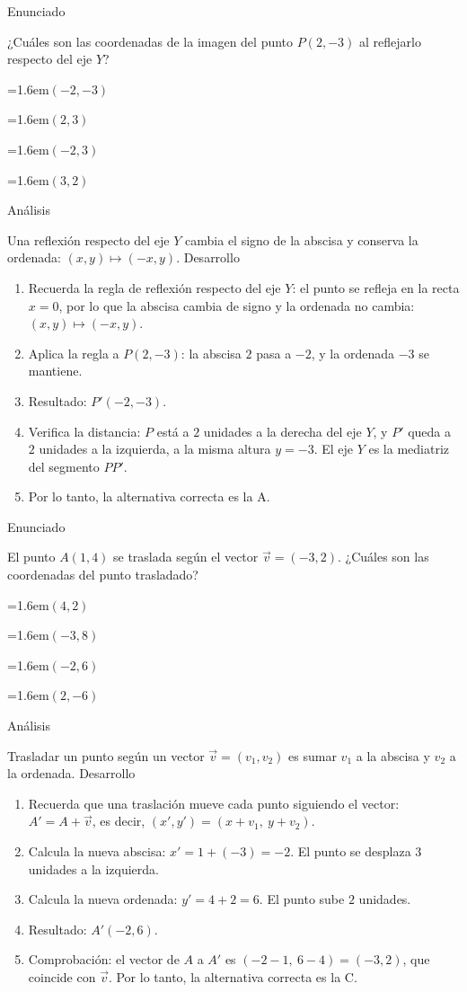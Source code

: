 \documentclass[10pt,a4paper,twocolumn]{article}
\newcommand{\alternativa}[2]{\par\noindent\hangindent=1.6em\hangafter=1\makebox[1.6em][l]{\tecla{#1}}#2\par}
\newcommand{\clave}[1]{\par\smallskip{\sffamily\footnotesize\color{esmeralda} Clave \teclaok{#1}}\par}
\begin{document}
\begin{ejemplo}
{\sffamily\footnotesize\color{zinc500} Enunciado}\par
¿Cuáles son las coordenadas de la imagen del punto $P(2, -3)$ al reflejarlo respecto del eje $Y$?
\alternativa{A}{$(-2, -3)$}
\alternativa{B}{$(2, 3)$}
\alternativa{C}{$(-2, 3)$}
\alternativa{D}{$(3, 2)$}
\clave{A}
{\sffamily\footnotesize\color{zinc500} Análisis}\par Una reflexión respecto del eje $Y$ cambia el signo de la abscisa y conserva la ordenada: $(x, y) \mapsto (-x, y)$.
{\sffamily\footnotesize\color{zinc500} Desarrollo}
\begin{enumerate}
  \item Recuerda la regla de reflexión respecto del eje $Y$: el punto se refleja en la recta $x = 0$, por lo que la abscisa cambia de signo y la ordenada no cambia: $(x,y)\mapsto(-x,y)$.
  \item Aplica la regla a $P(2, -3)$: la abscisa $2$ pasa a $-2$, y la ordenada $-3$ se mantiene.
  \item Resultado: $P'(-2, -3)$.
  \item Verifica la distancia: $P$ está a $2$ unidades a la derecha del eje $Y$, y $P'$ queda a $2$ unidades a la izquierda, a la misma altura $y = -3$. El eje $Y$ es la mediatriz del segmento $PP'$.
  \item Por lo tanto, la alternativa correcta es la A.
\end{enumerate}
\end{ejemplo}

\begin{ejemplo}
{\sffamily\footnotesize\color{zinc500} Enunciado}\par
El punto $A(1, 4)$ se traslada según el vector $\vec{v} = (-3, 2)$. ¿Cuáles son las coordenadas del punto trasladado?
\alternativa{A}{$(4, 2)$}
\alternativa{B}{$(-3, 8)$}
\alternativa{C}{$(-2, 6)$}
\alternativa{D}{$(2, -6)$}
\clave{C}
{\sffamily\footnotesize\color{zinc500} Análisis}\par Trasladar un punto según un vector $\vec{v} = (v_1, v_2)$ es sumar $v_1$ a la abscisa y $v_2$ a la ordenada.
{\sffamily\footnotesize\color{zinc500} Desarrollo}
\begin{enumerate}
  \item Recuerda que una traslación mueve cada punto siguiendo el vector: $A' = A + \vec{v}$, es decir, $(x', y') = (x + v_1,\ y + v_2)$.
  \item Calcula la nueva abscisa: $x' = 1 + (-3) = -2$. El punto se desplaza $3$ unidades a la izquierda.
  \item Calcula la nueva ordenada: $y' = 4 + 2 = 6$. El punto sube $2$ unidades.
  \item Resultado: $A'(-2, 6)$.
  \item Comprobación: el vector de $A$ a $A'$ es $(-2 - 1,\ 6 - 4) = (-3, 2)$, que coincide con $\vec{v}$. Por lo tanto, la alternativa correcta es la C.
\end{enumerate}
\end{ejemplo}
\end{document}

